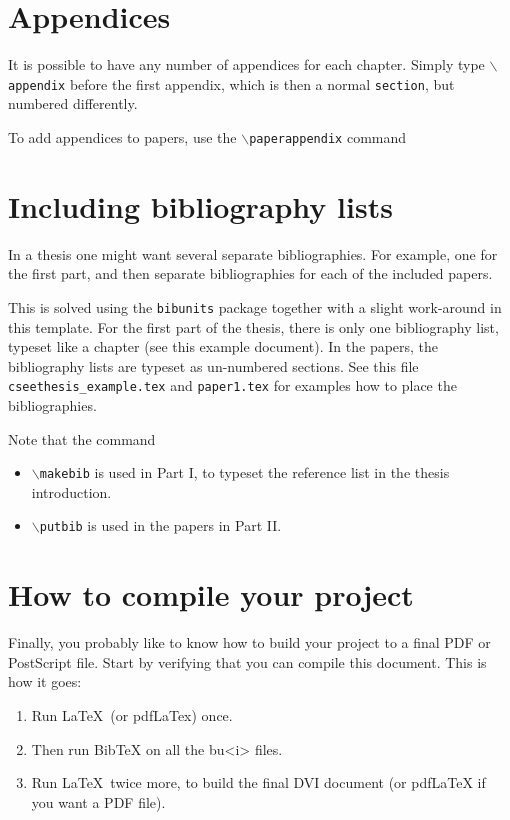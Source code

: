 \section{Appendices\label{sec:app}}
It is possible to have any number of appendices for each chapter.
Simply type \texttt{$\backslash$appendix} before the first appendix,
which is then a normal \texttt{section}, but numbered differently.

To add appendices to papers, use the
\texttt{$\backslash$paperappendix} command

\section{Including bibliography lists\label{sec:bib}}
In a thesis one might want several separate bibliographies. For
example, one for the first part, and then separate bibliographies
for each of the included papers.

This is solved using the \texttt{bibunits} package together with a
slight work-around in this template. For the first part of the
thesis, there is only one bibliography list, typeset like a chapter
(see this example document). In the papers, the bibliography lists
are typeset as un-numbered sections. See this file
\texttt{cseethesis\_example.tex} and \texttt{paper1.tex} for examples
how to place the bibliographies. 

Note that the command
\begin{itemize}
	\item \texttt{$\backslash$makebib} is used in Part I, to typeset the reference list in the thesis introduction.
	\item \texttt{$\backslash$putbib} is used in the papers in Part II.
\end{itemize}

\section{How to compile your project}
Finally, you probably like to know how to build your project to a
final PDF or PostScript file. Start by verifying that you can
compile this document. This is how it goes:
%
\begin{enumerate}
    \item Run \LaTeX\ (or pdfLaTex) once.
    \item Then run BibTeX on all the
    bu<i> files.
    \item Run \LaTeX\ twice more, to build the final DVI document
    (or pdfLaTeX if you want a PDF file).
\end{enumerate}

